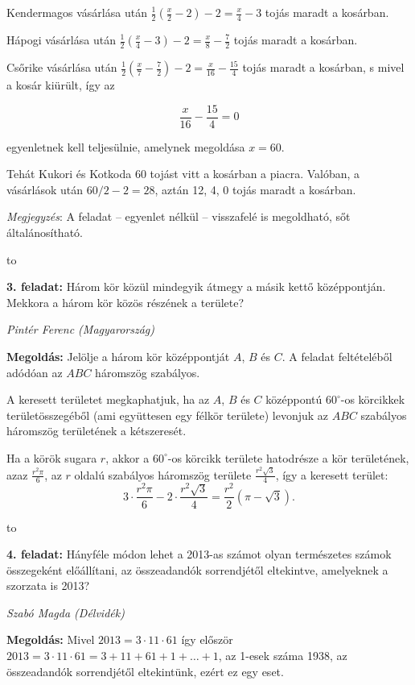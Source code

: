 \documentclass[a4paper,10pt]{article}
\newcommand{\ki}[2]{\hfill {\it #1 (#2)}\medskip}
\newcommand{\vonal}{\hbox to \hsize{\hskip2truecm\hrulefill\hskip2truecm}}
\begin{document}
Kendermagos vásárlása után $\frac{1}{2}\left(\frac{x}{2}-2\right)-2=\frac{x}{4}-3$ tojás maradt a kosárban.

Hápogi vásárlása után $\frac{1}{2}\left(\frac{x}{4}-3\right)-2=\frac{x}{8}-\frac{7}{2}$ tojás maradt a kosárban.

Csőrike vásárlása után $\frac{1}{2}\left(\frac{x}{7}-\frac{7}{2}\right)-2=\frac{x}{16}-\frac{15}{4}$ tojás maradt a kosárban, s mivel a kosár
kiürült, így az

$$\frac{x}{16}-\frac{15}{4}=0$$

egyenletnek kell teljesülnie, amelynek megoldása $x=60$.

Tehát Kukori és Kotkoda 60 tojást vitt a kosárban a piacra. 
Valóban, a vásárlások után $60/2 - 2 = 28$, aztán 12, 4, 0 tojás maradt a kosárban. 

\textit{Megjegyzés}: A feladat -- egyenlet nélkül -- visszafelé is megoldható, sőt általánosítható.

\medskip

\vonal


{\bf 3. feladat: } Három kör közül mindegyik átmegy a másik kettő középpontján. Mekkora a három kör 
közös részének a területe? 

\ki{Pintér Ferenc}{Magyarország}\medskip

{\bf Megoldás: } Jelölje a három kör középpontját $A$, $B$ és $C$. A feladat feltételéből adódóan az $ABC$ háromszög
szabályos.

A keresett területet megkaphatjuk, ha az $A$, $B$ és $C$ középpontú $60^\circ$-os körcikkek
területösszegéből (ami együttesen egy félkör területe) levonjuk az $ABC$ szabályos háromszög
területének a kétszeresét.

Ha a körök sugara $r$, akkor a $60^\circ$-os körcikk területe hatodrésze a kör területének, azaz $\frac{r^2\pi}{6}$,
az $r$ oldalú szabályos háromszög területe $\frac{r^2\sqrt 3}{4}$, így a keresett terület:
$$3\cdot \frac{r^2\pi}{6}-2\cdot \frac{r^2\sqrt 3}{4}=\frac{r^2}{2}\left(\pi-\sqrt 3\right).$$
\medskip

\vonal


{\bf 4. feladat: }  Hányféle módon lehet a 2013-as számot olyan természetes számok összegeként előállítani, az összeadandók sorrendjétől eltekintve, amelyeknek a szorzata is 2013? 


\ki{Szabó Magda}{Délvidék}\medskip

{\bf Megoldás: } Mivel $2013 = 3 \cdot  11 \cdot  61$ így először  
$2013 = 3 \cdot  11 \cdot  61 = 3 + 11 + 61 + 1 +\ldots+1$, az 1-esek
száma 1938, az összeadandók sorrendjétől eltekintünk, ezért ez egy eset. 
\end{document}
